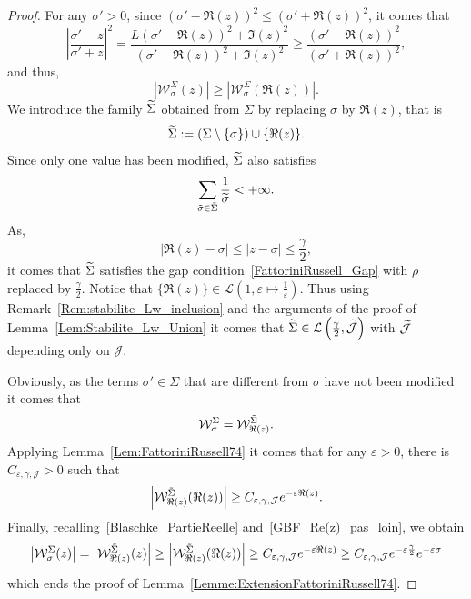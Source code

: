\documentclass[11pt]{article}
\theoremstyle{definition}
\numberwithin{equation}{section}
\numberwithin{figure}{section}
\numberwithin{table}{section}
\newcommand{\LL}{\mathcal{L}}
\let\oldtilde\tilde
\renewcommand*{\tilde}[1]{\mathchoice{\widetilde{#1}}{\widetilde{#1}}{\oldtilde{#1}}{\oldtilde{#1}}}\let\oldexists\exists
\renewcommand*{\exists}{\mathrel{\oldexists}}
\begin{document}
\begin{proof}
For any $\sigma'>0$, since $(\sigma' - \Re(z))^2 \leq (\sigma' + \Re(z))^2$, it comes that
\[
\left| \frac{\sigma' - z}{\sigma'+z} \right|^2 = \frac{L(\sigma' -\Re(z))^2 + \Im(z)^2}{(\sigma' + \Re(z))^2 + \Im(z)^2} \geq \frac{(\sigma'-\Re(z))^2}{(\sigma' + \Re(z))^2},
\]
and thus,
\begin{equation}\label{Blaschke_PartieReelle}
\left| \mathcal{W}^{\Sigma}_{\sigma}(z) \right| \geq \left| \mathcal{W}^{\Sigma}_{\sigma}(\Re(z)) \right|.
\end{equation}
We introduce the family $\tilde{\Sigma}$ obtained from $\Sigma$ by replacing $\sigma$ by $\Re(z)$, that is
\[
\tilde{\Sigma} :=\left(\Sigma \setminus\{\sigma\}\right)\cup \{\Re(z) \}.
\]
Since only one value has been modified, $\tilde{\Sigma}$ also satisfies
\[
\sum_{\tilde{\sigma} \in \tilde{\Sigma}} \frac{1}{\tilde{\sigma}} < +\infty.
\]
As,
\begin{equation}\label{GBF_Re(z)_pas_loin}
|\Re(z) - \sigma| \leq |z - \sigma| \leq \frac{\gamma}{2},
\end{equation}
it comes that $\tilde{\Sigma}$ satisfies the gap condition~\eqref{FattoriniRussell_Gap} with $\rho$ replaced by $\frac{\gamma}{2}$. Notice that $\{\Re(z) \} \in \LL \left(1, \varepsilon \mapsto \frac{1}{\varepsilon} \right)$. Thus using Remark~\ref{Rem:stabilite_Lw_inclusion} and the arguments of the proof of Lemma~\ref{Lem:Stabilite_Lw_Union} it comes that $\tilde{\Sigma}\in \mathcal{L}\left(\frac{\gamma}{2},\tilde{\mathcal{J}}\right)$ with $\tilde{\mathcal{J}}$ depending only on $\mathcal{J}$.


Obviously, as the terms $\sigma'\in \Sigma$ that are different from $\sigma$ have not been modified it comes that
\[
\mathcal{W}^{\Sigma}_{\sigma} = \mathcal{W}^{\tilde{\Sigma}}_{\Re(z)}.
\]
Applying Lemma~\ref{Lem:FattoriniRussell74} it comes that for any $\varepsilon>0$, there is $C_{\varepsilon, \gamma, \mathcal{J}}>0$ such that
\[
\left|\mathcal{W}^{\tilde{\Sigma}}_{\Re(z)}(\Re(z)) \right| \geq C_{\varepsilon, \gamma, \mathcal{J}} e^{-\varepsilon \Re(z)}.
\]
Finally, recalling~\eqref{Blaschke_PartieReelle} and~\eqref{GBF_Re(z)_pas_loin}, we obtain
\[
\left|\mathcal{W}^{\Sigma}_{\sigma}(z) \right| = \left|\mathcal{W}^{\tilde{\Sigma}}_{\Re(z)}(z) \right| \geq \left|\mathcal{W}^{\tilde{\Sigma}}_{\Re(z)}(\Re(z)) \right|
\geq C_{\varepsilon, \gamma, \mathcal{J}} e^{-\varepsilon \Re(z)}
\geq C_{\varepsilon, \gamma, \mathcal{J}} e^{-\varepsilon \frac{\gamma}{2}} e^{-\varepsilon \sigma}
\]
which ends the proof of Lemma~\ref{Lemme:ExtensionFattoriniRussell74}.
\end{proof}
\end{document}
